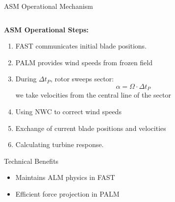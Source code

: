 \documentclass[aspectratio=1610]{beamer}
\begin{document}
\begin{frame}{ASM Operational Mechanism}
    \begin{columns}
        \begin{column}{0.6\textwidth}
            \textbf{ASM Operational Steps:}
            \begin{enumerate}
                \item FAST communicates initial blade positions.
                \item PALM provides wind speeds from frozen field
                \item During $\Delta t_P$, rotor sweeps sector: 
                $$\alpha = \Omega \cdot \Delta t_P$$ we take velocities from the central line of the sector 
                \item Using NWC to correct wind speeds
                \item Exchange of current blade positions and velocities
                \item Calculating turbine response.
            \end{enumerate}
            
            \vspace{0.3cm}
            \begin{block}{Technical Benefits}
                \begin{itemize}
                    \item Maintains ALM physics in FAST
                    \item Efficient force projection in PALM
                \end{itemize}
            \end{block}
        \end{column}
        

\end{columns}
\end{frame}
\end{document}
